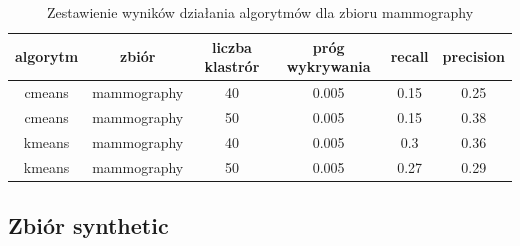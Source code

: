 \documentclass{classrep}
\begin{document}
{{            \begin{table}[!htbp]
                \footnotesize
                \centering
                \begin{tabular}{|c|c|c|c|c|c|}
                    \hline
                    algorytm & zbiór & liczba klastrór & próg wykrywania & recall & precision \\ \hline
                    cmeans & mammography & 40 & 0.005 & 0.15 & 0.25 \\
                    cmeans & mammography & 50 & 0.005 & 0.15 & 0.38 \\ \hline
                    kmeans & mammography & 40 & 0.005 & 0.3 & 0.36 \\
                    kmeans & mammography & 50 & 0.005 & 0.27 & 0.29 \\ \hline
                \end{tabular}
                \caption
                {Zestawienie wyników działania algorytmów dla zbioru mammography}
                \label{tab:mamm}
            \end{table}
            \FloatBarrier
        }

        \subsection{Zbiór synthetic} {

}}
\end{document}
